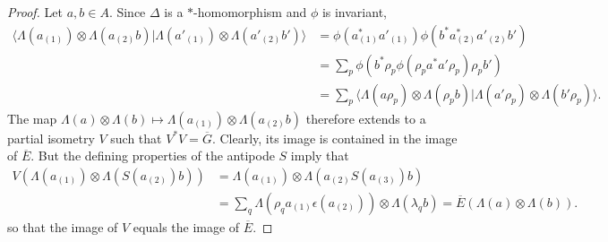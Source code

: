 \begin{proof}
  Let $a,b \in A$. Since $\Delta$ is a $*$-homomorphism and $\phi$ is
invariant,
  \begin{align*}
    \langle \Lambda(a_{(1)}) \otimes
    \Lambda(a_{(2)}b)|\Lambda(a'_{(1)}) \otimes
    \Lambda(a'_{(2)}b')\rangle &=
    \phi(a_{(1)}^{*}a'_{(1)})\phi(b^{*}a_{(2)}^{*}a'_{(2)}b') \\
    &= \sum_{p}
    \phi(b^{*}\rho_{p}\phi(\rho_{p}a^{*}a'\rho_{p})\rho_{p}b') \\
    & =\sum_{p} \langle\Lambda(a\rho_{p}) \otimes \Lambda(\rho_{p}b) |
    \Lambda(a'\rho_{p}) \otimes \Lambda(b'\rho_{p})\rangle.
  \end{align*}
 The map $\Lambda(a) \otimes \Lambda(b)  \mapsto \Lambda(a_{(1)})
 \otimes \Lambda(a_{(2)}b)$ therefore extends to a partial isometry
 $V$ such that $V^{*}V=\overline{G}$. Clearly, its image is
 contained in the image of $\overline{E}$. But the defining properties of the
 antipode $S$ imply that
 \begin{align*}
 V(\Lambda(a_{(1)}) \otimes \Lambda(S(a_{(2)})b))   &=
 \Lambda(a_{(1)}) \otimes \Lambda(a_{(2)}S(a_{(3)})b) \\
 &= \sum_{q}\Lambda(\rho_{q}a_{(1)}\epsilon(a_{(2)})) \otimes \Lambda(\lambda_{q}b) 
 =\overline{E}(\Lambda(a) \otimes \Lambda(b)).
 \end{align*}
so that the image of $V$ equals the image of $\overline{E}$.
\end{proof}

